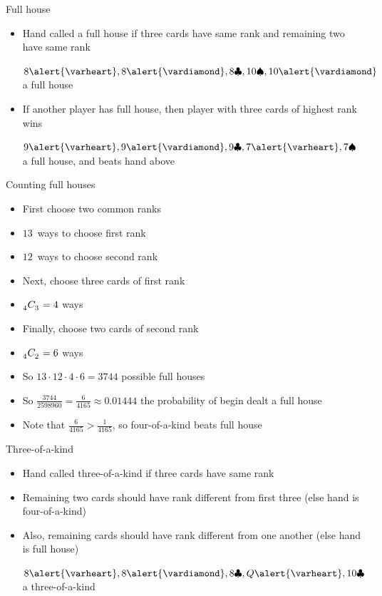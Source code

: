 \documentclass[handout]{beamer}
\theoremstyle{definition}
\newcommand\ncr[2]{\tensor[_{#1}]C{_{#2}}}
\newcommand{\hs}{\alert{\varheart}}
\newcommand{\ds}{\alert{\vardiamond}}
\newcommand{\s}{\spadesuit}
\newcommand{\cs}{\clubsuit}
\begin{document}
\begin{frame}{Full house}
\begin{itemize}
\item Hand called a \alert{full house} if three
cards have same rank and remaining two have same rank
\begin{example} $8\hs,8\ds,8\cs,10\s,10\ds$ a full house\end{example}
\item If another player has full house, then player with
three cards of highest rank wins
\begin{example} $9\hs,9\ds,9\cs,7\hs,7\s$ a full house,
and beats hand above\end{example}
\end{itemize}
\end{frame}

\begin{frame}{Counting full houses}
\begin{itemize}
\item First choose two common ranks
\item $13$~ways to choose first rank
\item $12$~ways to choose second rank
\item Next, choose three cards of first rank
\item $\ncr{4}{3}=4$ ways
\item Finally, choose two cards of second rank
\item $\ncr{4}{2}=6$ ways
\item So $13\cdot 12\cdot 4\cdot 6=3744$ possible full houses
\item So $\frac{3744}{2598960}=\frac{6}{4165}\approx 0.01444$
the probability of begin dealt a full house
\item Note that $\frac{6}{4165}>\frac{1}{4165}$,
so four-of-a-kind beats full house
\end{itemize}
\end{frame}

\begin{frame}{Three-of-a-kind}
\begin{itemize}
\item Hand called \alert{three-of-a-kind} if
three cards have same rank
\item Remaining two cards should have rank different
from first three (else hand is four-of-a-kind)
\item Also, remaining cards should have rank
different from one another (else hand is full house)
\begin{example} $8\hs,8\ds,8\cs,Q\hs,10\cs$ a three-of-a-kind\end{example}
\end{itemize}
\end{frame}
\end{document}
